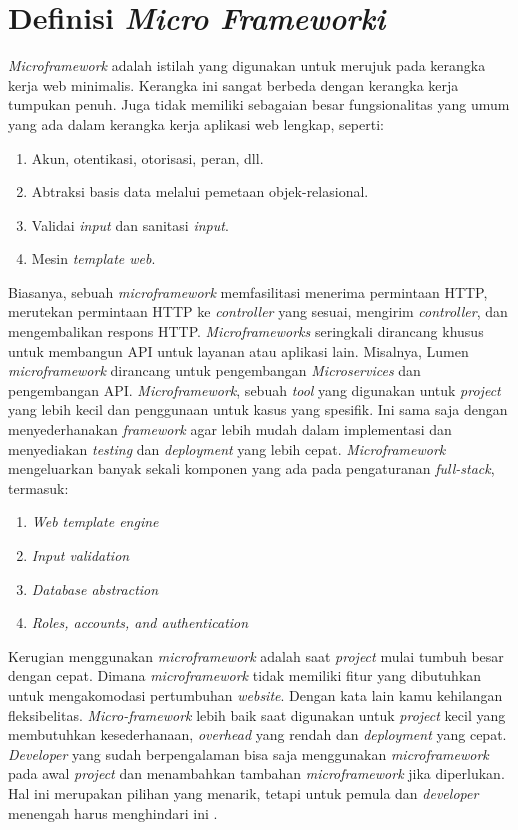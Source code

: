 \section{Definisi \textit{Micro Frameworki}}

\textit{Microframework} adalah istilah yang digunakan untuk merujuk pada kerangka kerja web minimalis. Kerangka ini sangat berbeda dengan kerangka kerja tumpukan penuh. Juga tidak memiliki sebagaian besar fungsionalitas yang umum yang ada dalam kerangka kerja aplikasi web lengkap, seperti:
\begin{enumerate}
\item Akun, otentikasi, otorisasi, peran, dll.
\item Abtraksi basis data melalui pemetaan objek-relasional.
\item Validai  \textit{input} dan sanitasi \textit{input}.
\item Mesin \textit{template web}.
\end{enumerate}

Biasanya, sebuah \textit{microframework} memfasilitasi menerima permintaan HTTP, merutekan permintaan HTTP ke \textit{controller} yang sesuai, mengirim \textit{controller}, dan mengembalikan respons HTTP. \textit{Microframeworks} seringkali dirancang khusus untuk membangun API untuk layanan atau aplikasi lain. Misalnya, Lumen \textit{microframework} dirancang untuk pengembangan \textit{Microservices} dan pengembangan API. \textit{Microframework}, sebuah \textit{tool} yang digunakan untuk \textit{project} yang lebih kecil dan penggunaan untuk kasus yang spesifik. Ini sama saja dengan menyederhanakan \textit{framework} agar lebih mudah dalam implementasi dan menyediakan \textit{testing} dan \textit{deployment} yang lebih cepat. \textit{Microframework} mengeluarkan banyak sekali komponen yang ada pada pengaturanan \textit{full-stack}, termasuk:
\begin{enumerate}
\item \textit{Web template engine}
\item \textit{Input validation}
\item \textit{Database abstraction}
\item \textit{Roles, accounts, and authentication}
\end{enumerate}

Kerugian menggunakan  \textit{microframework} adalah saat  \textit{project} mulai tumbuh besar dengan cepat. Dimana  \textit{microframework} tidak memiliki fitur yang dibutuhkan untuk mengakomodasi pertumbuhan  \textit{website}. Dengan kata lain kamu kehilangan fleksibelitas.  \textit{Micro-framework} lebih baik saat digunakan untuk  \textit{project} kecil yang membutuhkan kesederhanaan,  \textit{overhead} yang rendah dan  \textit{deployment} yang cepat.  \textit{Developer} yang sudah berpengalaman bisa saja menggunakan  \textit{microframework} pada awal  \textit{project} dan menambahkan tambahan  \textit{microframework} jika diperlukan. Hal ini merupakan pilihan yang menarik, tetapi untuk pemula dan  \textit{developer} menengah harus menghindari ini \cite{fadhilnet}.
